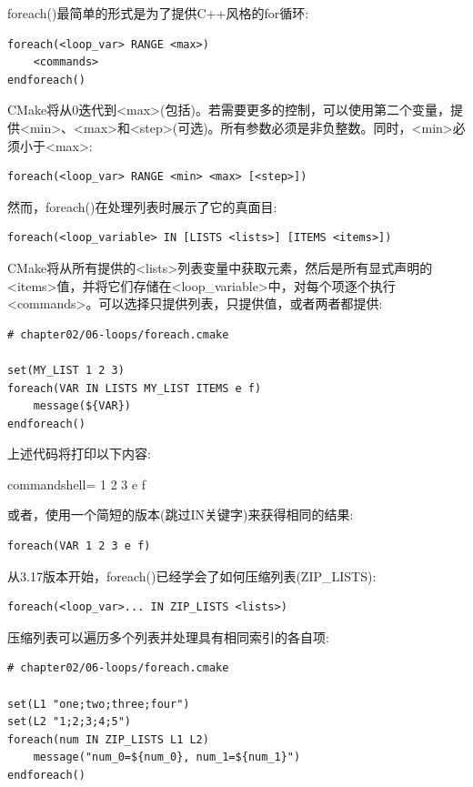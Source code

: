 foreach()最简单的形式是为了提供C++风格的for循环:

\begin{lstlisting}[style=styleCMake]
foreach(<loop_var> RANGE <max>)
	<commands>
endforeach()
\end{lstlisting}

CMake将从0迭代到<max>(包括)。若需要更多的控制，可以使用第二个变量，提供<min>、<max>和<step>(可选)。所有参数必须是非负整数。同时，<min>必须小于<max>:

\begin{lstlisting}[style=styleCMake]
foreach(<loop_var> RANGE <min> <max> [<step>])
\end{lstlisting}

然而，foreach()在处理列表时展示了它的真面目:

\begin{lstlisting}[style=styleCMake]
foreach(<loop_variable> IN [LISTS <lists>] [ITEMS <items>])
\end{lstlisting}

CMake将从所有提供的<lists>列表变量中获取元素，然后是所有显式声明的<items>值，并将它们存储在<loop\_variable>中，对每个项逐个执行<commands>。可以选择只提供列表，只提供值，或者两者都提供:

\begin{lstlisting}[style=styleCMake]
# chapter02/06-loops/foreach.cmake

set(MY_LIST 1 2 3)
foreach(VAR IN LISTS MY_LIST ITEMS e f)
	message(${VAR})
endforeach()
\end{lstlisting}

上述代码将打印以下内容:

\begin{tcblisting}{commandshell={}}
1 
2 
3 
e 
f
\end{tcblisting}

或者，使用一个简短的版本(跳过IN关键字)来获得相同的结果:

\begin{lstlisting}[style=styleCMake]
foreach(VAR 1 2 3 e f)
\end{lstlisting}

从3.17版本开始，foreach()已经学会了如何压缩列表(ZIP\_LISTS):

\begin{lstlisting}[style=styleCMake]
foreach(<loop_var>... IN ZIP_LISTS <lists>)
\end{lstlisting}

压缩列表可以遍历多个列表并处理具有相同索引的各自项:

\begin{lstlisting}[style=styleCMake]
# chapter02/06-loops/foreach.cmake

set(L1 "one;two;three;four")
set(L2 "1;2;3;4;5")
foreach(num IN ZIP_LISTS L1 L2)
	message("num_0=${num_0}, num_1=${num_1}")
endforeach()
\end{lstlisting}

